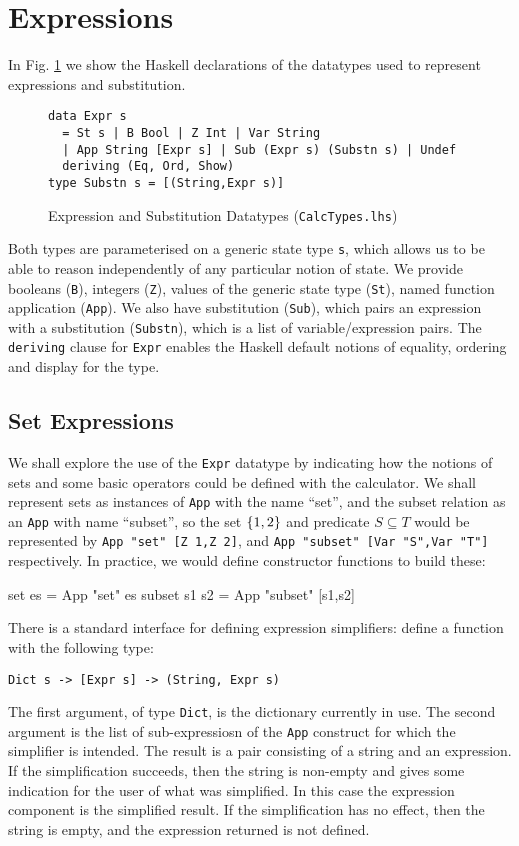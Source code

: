 \section{Expressions}\label{sec:Expressions}

In Fig. \ref{fig:expr-types} we show the Haskell declarations
of the datatypes used to represent expressions and substitution.
\begin{figure}[tb]
\begin{verbatim}
data Expr s
  = St s | B Bool | Z Int | Var String
  | App String [Expr s] | Sub (Expr s) (Substn s) | Undef
  deriving (Eq, Ord, Show)
type Substn s = [(String,Expr s)]
\end{verbatim}
  \caption{Expression and Substitution Datatypes (\texttt{CalcTypes.lhs})}
  \label{fig:expr-types}
\end{figure}
Both types are parameterised on a generic state type \texttt{s},
which allows us to be able to reason independently
of any particular notion of state.
We provide booleans (\texttt{B}),
integers (\texttt{Z}),
values of the generic state type (\texttt{St}),
named function application (\texttt{App}).
We also have substitution (\texttt{Sub}), which pairs an expression
with a substitution (\texttt{Substn}),
which is a list of variable/expression pairs.
The \texttt{deriving} clause for \texttt{Expr}
enables the Haskell default notions
of equality, ordering and display for the type.

\subsection{Set Expressions}

We shall explore the use of the \texttt{Expr}  datatype
by indicating how the notions of sets and some basic operators
could be defined with the calculator.
We shall represent sets as instances of \texttt{App} with the name ``set'',
and the subset relation as an \texttt{App} with name ``subset'',
so the set $\{{1,2}\}$  and predicate $S \subseteq T$
would be represented by
\verb$App "set" [Z 1,Z 2]$,
and
\verb$App "subset" [Var "S",Var "T"]$ respectively.
In practice, we would define constructor functions to build
these:
\begin{code}
set es = App "set" es
subset s1 s2 = App "subset" [s1,s2]
\end{code}
There is a standard interface for defining expression simplifiers:
define a function with the following type:
\begin{verbatim}
Dict s -> [Expr s] -> (String, Expr s)
\end{verbatim}
The first argument, of type \texttt{Dict},
is the dictionary currently in use.
The second argument is the list of sub-expressiosn of
the \texttt{App} construct for which the simplifier is intended.
The result is a pair consisting of a string and an expression.
If the simplification succeeds, then the string is non-empty
and gives some indication for the user
of what was simplified.
In this case the expression component is the simplified result.
If the simplification has no effect, then the string is empty,
and the expression returned is not defined.

